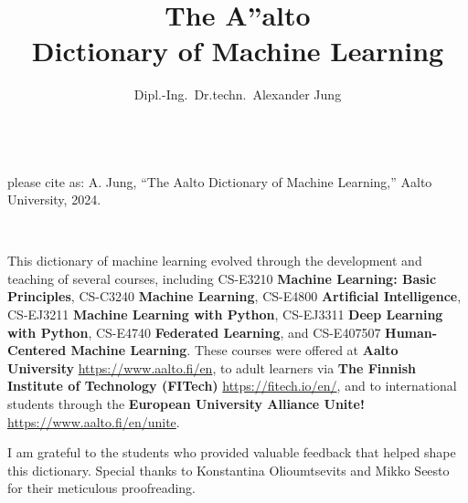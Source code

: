 \documentclass[journal,12pt,onecolumn]{article}
\begin{document}
\title {\vspace*{10mm}
	{\huge {\bf The {\fontsize{40}{48}\selectfont \textbf{\textsf{A\hspace*{-2mm}''}}}\hspace*{-4mm}alto \\ Dictionary of Machine Learning}}  \\[-5mm] 
}

\author{Dipl.-Ing.\ Dr.techn.\ Alexander Jung \\[-6mm]%
}

\maketitle
	\begin{center}
	\\[10mm]
{\large	please cite as: A. Jung, ``The Aalto Dictionary of Machine Learning,'' Aalto University, 2024.}
\end{center}

\newpage 
{}\

\noindent This dictionary of machine learning evolved through the development 
and teaching of several courses, including CS-E3210 {\bf Machine Learning: Basic Principles}, 
CS-C3240 {\bf Machine Learning}, CS-E4800 {\bf Artificial Intelligence}, CS-EJ3211 {\bf Machine Learning with Python}, 
CS-EJ3311 {\bf Deep Learning with Python}, CS-E4740 {\bf Federated Learning}, and 
CS-E407507 {\bf Human-Centered Machine Learning}. These courses were offered at 
{\bf Aalto University} \url{https://www.aalto.fi/en}, to adult learners via 
{\bf The Finnish Institute of Technology (FITech)} \url{https://fitech.io/en/}, and to international 
students through the {\bf European University Alliance Unite!} \url{https://www.aalto.fi/en/unite}.

I am grateful to the students who provided valuable feedback that helped shape this dictionary. 
Special thanks to Konstantina Olioumtsevits and Mikko Seesto for their meticulous proofreading.



\newpage 


\newpage
\glsaddallunused
\printglossary[nonumberlist]


\newpage
{}
\pagestyle{empty}  %
\printindex  %




\newpage


\end{document}
